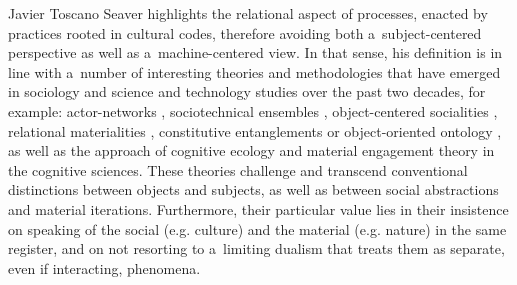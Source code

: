 \begin{artengenv}{Javier Toscano}
Seaver highlights the relational aspect of processes, enacted by practices rooted in cultural codes, therefore avoiding both a~subject-centered perspective as well as a~machine-centered view. In that sense, his definition is in line with a~number of interesting theories and methodologies that have emerged in sociology and science and technology studies over the past two decades, for example: actor-networks
\parencites[][]{law_elements_1986}[][]{bijker_where_1992}[][]{latour_reassembling_2005}, %
 sociotechnical ensembles 
\parencite[][]{bijker_bicycles_1999}, %
 object-centered socialities 
\parencite[][]{knorr_cetina_sociality_1997}, %
 relational materialities 
\parencite[][]{law_after_2004}, %
 constitutive entanglements 
\parencite[][]{orlikowski_sociomaterial_2007} %
 or object-oriented ontology 
\parencites[][]{harman_tool-being_2002}[][]{bryant_onticologymanifesto_2010}, %
 as well as the approach of cognitive ecology 
\parencite[][]{hutchins_cognitive_2010} %
 and material engagement theory 
\parencites[][]{malafouris_cognitive_2005}[][]{malafouris_how_2013} %
 in the cognitive sciences. These theories challenge and transcend conventional distinctions between objects and subjects, as well as between social abstractions and material iterations. Furthermore, their particular value lies in their insistence on speaking of the social (e.g. culture) and the material (e.g. nature) in the same register, and on not resorting to a~limiting dualism that treats them as separate, even if interacting, phenomena.


\end{artengenv}
